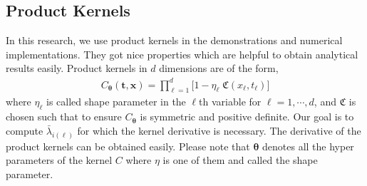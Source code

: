 \documentclass{svjour3}                     %
\newcommand{\bm}[1]{\boldsymbol{#1}}
\newcommand{\vtheta}{{\bm{\theta}}}
\newcommand{\vt}{\bm{t}}
\newcommand{\vx}{\bm{x}}
\begin{document}
\fi

































\subsection{Product Kernels}
\label{sec:product_kernel}

In this research, we use product kernels in the demonstrations and numerical implementations. They got nice properties which are helpful to obtain analytical results easily. Product kernels in $d$ dimensions are of the form,
\begin{align}
\label{eqn:prod_kernel}
C_\vtheta(\vt, \vx) = 
\prod_{\ell=1}^d \biggl[ 1 - \eta_\ell \; \mathfrak{C}(x_\ell,t_\ell) \biggr]
\end{align}
where $\eta_\ell$ is called shape parameter in the $\ell$th variable for $\ell=1,\cdots,d$, and $\mathfrak{C}$ is chosen such that to ensure $C_{\vtheta}$ is symmetric and positive definite. Our goal is to compute $\bar{\lambda}_{i(\ell)}$ for which the kernel derivative is necessary. The derivative of the product kernels can be obtained easily. Please note that $\vtheta$ denotes all the hyper parameters of the kernel $C$ where $\eta$ is one of them and called the shape parameter.
\end{document}
